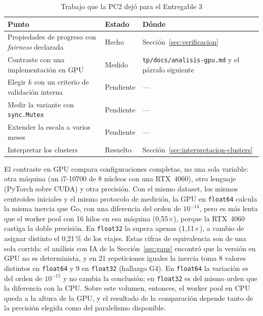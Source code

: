 \begin{table}[H]
\caption{Trabajo que la PC2 dejó para el Entregable 3}\label{tab:pendiente-pc2}
\small
\begin{tabularx}{\textwidth}{@{}L{5.4cm}L{2.2cm}Y@{}}
\toprule
\textbf{Punto} & \textbf{Estado} & \textbf{Dónde} \\
\midrule
Propiedades de progreso con \emph{fairness} declarada & Hecho & Sección~\ref{sec:verificacion} \\
\addlinespace
Contraste con una implementación en GPU & Medido & \texttt{tp/docs/analisis-gpu.md} y el
  párrafo siguiente \\
\addlinespace
Elegir $k$ con un criterio de validación interna & Pendiente & --- \\
\addlinespace
Medir la variante con \texttt{sync.Mutex} & Pendiente & --- \\
\addlinespace
Extender la escala a varios meses & Pendiente & --- \\
\addlinespace
Interpretar los clusters & Resuelto & Sección~\ref{sec:interpretacion-clusters} \\
\bottomrule
\end{tabularx}
\end{table}

El contraste en GPU compara configuraciones completas, no una sola variable: otra máquina (un
i7-10700 de 8 núcleos con una RTX~4060), otro lenguaje (PyTorch sobre CUDA) y otra precisión. Con
el mismo dataset, los mismos centroides iniciales y el mismo protocolo de medición, la GPU en
\texttt{float64} calcula la misma inercia que Go, con una diferencia del orden de $10^{-14}$, pero es
más lenta que el worker pool con 16 hilos en esa máquina (0{,}55$\times$), porque la RTX~4060 castiga
la doble precisión. En \texttt{float32} la supera apenas (1{,}11$\times$), a cambio de asignar
distinto el 0{,}21\,\% de los viajes. Estas cifras de equivalencia son de una sola corrida: el
análisis con IA de la Sección~\ref{sec:gaps} encontró que la versión en GPU no es determinista, y en
21 repeticiones iguales la inercia toma 8 valores distintos en \texttt{float64} y 9 en
\texttt{float32} (hallazgo G4). En \texttt{float64} la variación es del orden de $10^{-15}$ y no
cambia la conclusión; en \texttt{float32} es del mismo orden que la diferencia con la CPU. Sobre este volumen, entonces, el worker pool en CPU queda a la
altura de la GPU, y el resultado de la comparación depende tanto de la precisión elegida como del
paralelismo disponible.
